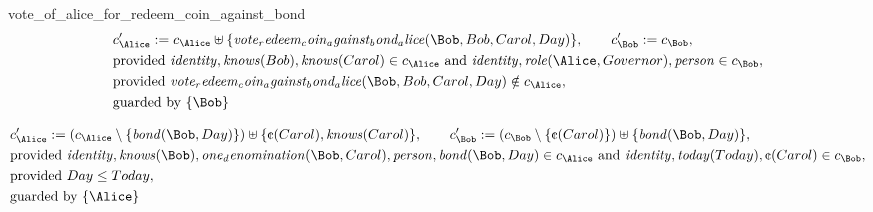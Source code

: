 vote_of_alice_for_redeem_coin_against_bond
\fi
\begin{align*}
&
c'_
{
\Alice
}
 := 
c_
{
\Alice
}
 \uplus 
\{
\mathit{
vote_redeem_coin_against_bond_alice
}
(
\Bob
,
Bob
,
Carol
,
Day
)
\}
, \qquad 
c'_
{
\Bob
}
 := 
c_
{
\Bob
}
,\\
&
\text{provided } 
\mathit{
identity
}
,
\mathit{
knows
}
(
Bob
)
,
\mathit{
knows
}
(
Carol
)
 \in c_
{
\Alice
}
 \text{ and } 
\mathit{
identity
}
,
\mathit{
role
}
(
\Alice
,
Governor
)
,
\mathit{
person
}
 \in c_
{
\Bob
}
,\\
&
\text{provided } 
\mathit{
vote_redeem_coin_against_bond_alice
}
(
\Bob
,
Bob
,
Carol
,
Day
)
 \notin c_
{
\Alice
}
,\\
&
\text{guarded by } \{
\Bob
\}
\end{align*}

\begin{align*}
&
c'_
{
\Alice
}
 := 
(c_
{
\Alice
}
 \setminus 
\{
\mathit{
bond
}
(
\Bob
,
Day
)
\}
) \uplus 
\{
\text{\textcent}
(
Carol
)
,
\mathit{
knows
}
(
Carol
)
\}
, \qquad 
c'_
{
\Bob
}
 := 
(c_
{
\Bob
}
 \setminus 
\{
\text{\textcent}
(
Carol
)
\}
) \uplus 
\{
\mathit{
bond
}
(
\Bob
,
Day
)
\}
,\\
&
\text{provided } 
\mathit{
identity
}
,
\mathit{
knows
}
(
\Bob
)
,
\mathit{
one_denomination
}
(
\Bob
,
Carol
)
,
\mathit{
person
}
,
\mathit{
bond
}
(
\Bob
,
Day
)
 \in c_
{
\Alice
}
 \text{ and } 
\mathit{
identity
}
,
\mathit{
today
}
(
Today
)
,
\text{\textcent}
(
Carol
)
 \in c_
{
\Bob
}
,\\
&
\text{provided } 
Day
\le
Today
,\\
&
\text{guarded by } \{
\Alice
\}
\end{align*}

